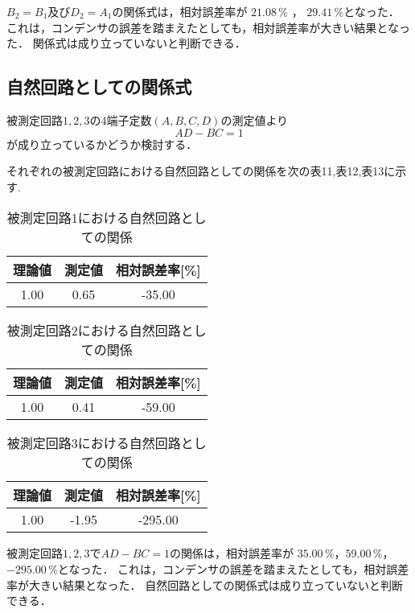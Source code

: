 $B_2=B_1$及び$D_2=A_1$の関係式は，相対誤差率が
$21.08\,\%$ ， $29.41\,\%$となった．
これは，コンデンサの誤差を踏まえたとしても，相対誤差率が大きい結果となった．
関係式は成り立っていないと判断できる．

\newpage

\subsection{自然回路としての関係式}
被測定回路$1,2,3$の4端子定数$(A, B, C, D)$の測定値より
$$
A D-B C=1
$$
が成り立っているかどうか検討する． 

それぞれの被測定回路における自然回路としての関係を次の表11,表12,表13に示す.

\begin{table}[!ht]
    \centering
    \caption{被測定回路1における自然回路としての関係}
    \begin{tabular}{cc|c}
    \hline
        理論値 & 測定値 & 相対誤差率[\%] \\ \hline
        1.00 & 0.65 & -35.00 \\ \hline
    \end{tabular}
\end{table}

\begin{table}[!ht]
    \centering
    \caption{被測定回路2における自然回路としての関係}
    \begin{tabular}{cc|c}
    \hline
        理論値 & 測定値 & 相対誤差率[\%] \\ \hline
        1.00 & 0.41 & -59.00 \\ \hline
    \end{tabular}
\end{table}

\begin{table}[!ht]
    \centering
    \caption{被測定回路3における自然回路としての関係}
    \begin{tabular}{cc|c}
    \hline
        理論値 & 測定値 & 相対誤差率[\%] \\ \hline
        1.00 & -1.95 & -295.00 \\ \hline
    \end{tabular}
\end{table}

被測定回路$1,2,3$で$A D-B C=1$の関係は，相対誤差率が
$35.00\,\%$，$59.00\,\%$，$-295.00\,\%$となった．
これは，コンデンサの誤差を踏まえたとしても，相対誤差率が大きい結果となった．
自然回路としての関係式は成り立っていないと判断できる．

